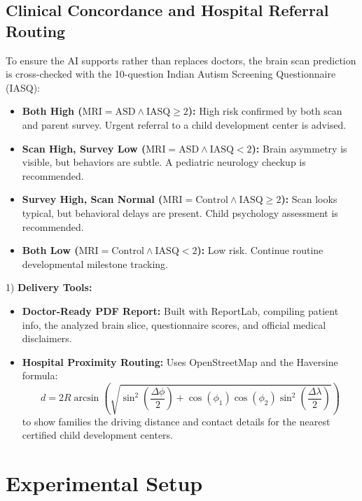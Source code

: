\documentclass[conference]{IEEEtran}
\begin{document}
\subsection{Clinical Concordance and Hospital Referral Routing}
To ensure the AI supports rather than replaces doctors, the brain scan prediction is cross-checked with the 10-question Indian Autism Screening Questionnaire (IASQ):
\begin{itemize}
    \item \textbf{Both High ($\text{MRI} = \text{ASD} \land \text{IASQ} \ge 2$):} High risk confirmed by both scan and parent survey. Urgent referral to a child development center is advised.
    \item \textbf{Scan High, Survey Low ($\text{MRI} = \text{ASD} \land \text{IASQ} < 2$):} Brain asymmetry is visible, but behaviors are subtle. A pediatric neurology checkup is recommended.
    \item \textbf{Survey High, Scan Normal ($\text{MRI} = \text{Control} \land \text{IASQ} \ge 2$):} Scan looks typical, but behavioral delays are present. Child psychology assessment is recommended.
    \item \textbf{Both Low ($\text{MRI} = \text{Control} \land \text{IASQ} < 2$):} Low risk. Continue routine developmental milestone tracking.
\end{itemize}

1) \textbf{Delivery Tools:}
\begin{itemize}
    \item \textbf{Doctor-Ready PDF Report:} Built with ReportLab, compiling patient info, the analyzed brain slice, questionnaire scores, and official medical disclaimers.
    \item \textbf{Hospital Proximity Routing:} Uses OpenStreetMap and the Haversine formula:
    \begin{equation}
    d = 2R \arcsin \left( \sqrt{\sin^2\left(\frac{\Delta \phi}{2}\right) + \cos(\phi_1)\cos(\phi_2)\sin^2\left(\frac{\Delta \lambda}{2}\right)} \right) \tag{10}
    \end{equation}
    to show families the driving distance and contact details for the nearest certified child development centers.
\end{itemize}

\section{Experimental Setup}
\end{document}
